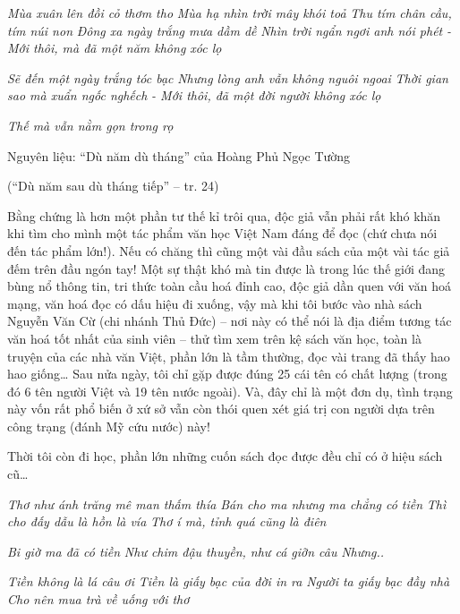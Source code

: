 \documentclass[../main.tex]{subfiles}
\begin{document}
\begin{multicols}{2}
\begin{blockquote}
\textit{Mùa xuân lên đồi cỏ thơm tho} 
\textit{Mùa hạ nhìn trời mây khói toả} 
\textit{Thu tím chân cầu, tím núi non} 
\textit{Đông xa ngày trắng mưa dầm dề} 
\textit{Nhìn trời ngẩn ngơi anh nói phét} 
\textit{- Mới thôi, mà đã một năm không xóc lọ} 

\textit{Sẽ đến một ngày trắng tóc bạc} 
\textit{Nhưng lòng anh vẫn không nguôi ngoai} 
\textit{Thời gian sao mà xuẩn ngốc nghếch} 
\textit{- Mới thôi, đã một đời người không xóc lọ} 

\textit{Thế mà vẫn nằm gọn trong rọ} 

Nguyên liệu: “Dù năm dù tháng” của Hoàng Phủ Ngọc Tường 

(“Dù năm sau dù tháng tiếp” – tr. 24) 

\end{blockquote}


Bằng chứng là hơn một phần tư thế kỉ trôi qua, độc giả vẫn phải rất khó khăn khi tìm cho mình một tác phẩm văn học Việt Nam đáng để đọc (chứ chưa nói đến tác phẩm lớn!). Nếu có chăng thì cũng một vài đầu sách của một vài tác giả đếm trên đầu ngón tay! Một sự thật khó mà tin được là trong lúc thế giới đang bùng nổ thông tin, tri thức toàn cầu hoá đỉnh cao, độc giả dần quen với văn hoá mạng, văn hoá đọc có dấu hiệu đi xuống, vậy mà khi tôi bước vào nhà sách Nguyễn Văn Cừ (chi nhánh Thủ Đức) – nơi này có thể nói là địa điểm tương tác văn hoá tốt nhất của sinh viên – thử tìm xem trên kệ sách văn học, toàn là truyện của các nhà văn Việt, phần lớn là tầm thường, đọc vài trang đã thấy hao hao giống… Sau nửa ngày, tôi chỉ gặp được đúng 25 cái tên có chất lượng (trong đó 6 tên người Việt và 19 tên nước ngoài). Và, đây chỉ là một đơn dụ, tình trạng này vốn rất phổ biến ở xứ sở vẫn còn thói quen xét giá trị con người dựa trên công trạng (đánh Mỹ cứu nước) này! 

Thời tôi còn đi học, phần lớn những cuốn sách đọc được đều chỉ có ở hiệu sách cũ… 
\begin{blockquote}


\textit{Thơ như ánh trăng mê man thấm thía} 
\textit{Bán cho ma nhưng ma chẳng có tiền} 
\textit{Thì cho đấy dẫu là hồn là vía} 
\textit{Thơ í mà, tỉnh quá cũng là điên} 

\textit{Bi giờ ma đã có tiền} 
\textit{Như chim đậu thuyền, như cá giỡn câu} 
\textit{Nhưng..} 

\textit{Tiền không là lá câu ơi} 
\textit{Tiền là giấy bạc của đời in ra} 
\textit{Người ta giấy bạc đầy nhà} 
\textit{Cho nên mua trà về uống với thơ} 


\end{blockquote}
\end{multicols}
\end{document}
